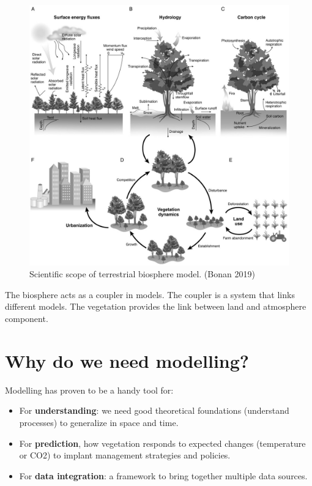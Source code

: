 \documentclass[12pt,oneside]{book}
\providecommand{\tightlist}{%
  \setlength{\itemsep}{0pt}\setlength{\parskip}{0pt}}
\begin{document}
\begin{figure}

{\centering \includegraphics[width=0.8\linewidth]{figures/chap1/cycles_bonan} 

}

\caption{Scientific scope of terrestrial biosphere model. (Bonan 2019)}\label{fig:f4}
\end{figure}

The biosphere acts as a coupler in models. The coupler is a system that
links different models. The vegetation provides the link between land
and atmosphere component.

\section{Why do we need modelling?}\label{why-do-we-need-modelling}

Modelling has proven to be a handy tool for:

\begin{itemize}
\tightlist
\item
  For \textbf{understanding}: we need good theoretical foundations
  (understand processes) to generalize in space and time.
\item
  For \textbf{prediction}, how vegetation responds to expected changes
  (temperature or CO2) to implant management strategies and policies.
\item
  For \textbf{data integration}: a framework to bring together multiple
  data sources.
\end{itemize}
\end{document}

